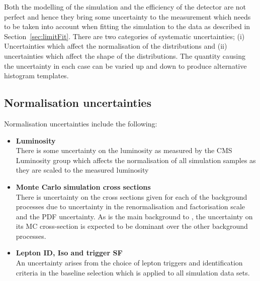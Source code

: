Both the modelling of the simulation and the efficiency of the detector are not perfect and hence they bring some uncertainty to the measurement which needs to be taken into account when fitting the simulation to the data as described in Section~\ref{sec:limitFit}.
There are two categories of systematic uncertainties; (i) Uncertainties which affect the normalisation of the distributions and (ii) uncertainties which affect the shape of the distributions. The quantity causing the uncertainty in each case can be varied up and down to produce alternative histogram templates.

\subsection{Normalisation uncertainties}
Normalisation uncertainties include the following:
\begin{itemize}
\item \textbf{Luminosity}\\
There is some uncertainty on the luminosity as measured by the CMS Luminosity group which affects the normalisation of all simulation samples as they are scaled to the measured luminosity

\item \textbf{Monte Carlo simulation cross sections}\\
There is uncertainty on the cross sections given for each of the background processes due to uncertainty in the renormalisation and factorisation scale and the PDF uncertainty. As \ttbar is the main background to \tttt, the uncertainty on its MC cross-section is expected to be dominant over the other background processes. 

\item \textbf{Lepton ID, Iso and trigger SF}\\
An uncertainty arises from the choice of lepton triggers and identification criteria in the baseline selection which is applied to all simulation data sets.

\end{itemize}

